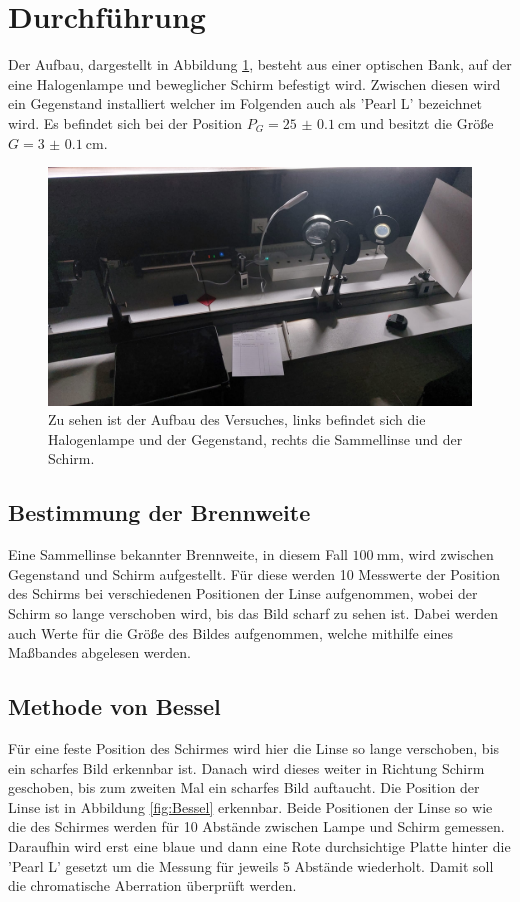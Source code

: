 \section{Durchführung}
\label{sec:Durchführung}
Der Aufbau, dargestellt in Abbildung \ref{fig:Aufbau}, besteht aus einer optischen Bank, auf der eine Halogenlampe und beweglicher Schirm befestigt wird. 
Zwischen diesen wird ein Gegenstand installiert welcher im Folgenden auch als 'Pearl L' bezeichnet wird.
Es befindet sich bei der Position $P_G=\qty{25(0.1)}{\centi\meter}$ und besitzt die Größe $G=\qty{3(0.1)}{\centi\meter}$.


\begin{figure}[H]
    \includegraphics[width=\textwidth]{Bilder/Aufbau.jpg}
    \centering
    \caption{Zu sehen ist der Aufbau des Versuches, links befindet sich die Halogenlampe und der Gegenstand, rechts die Sammellinse und der Schirm.}
    \label{fig:Aufbau}
\end{figure}

\subsection{Bestimmung der Brennweite}
Eine Sammellinse bekannter Brennweite, in diesem Fall $\qty{100}{\milli\meter}$, wird zwischen Gegenstand und Schirm aufgestellt.
Für diese werden 10 Messwerte der Position des Schirms bei verschiedenen Positionen der Linse aufgenommen, wobei der Schirm so lange verschoben wird, bis das Bild scharf zu sehen ist.
Dabei werden auch Werte für die Größe des Bildes aufgenommen, welche mithilfe eines Maßbandes abgelesen werden.

\subsection{Methode von Bessel}
Für eine feste Position des Schirmes wird hier die Linse so lange verschoben, bis ein scharfes Bild erkennbar ist. 
Danach wird dieses weiter in Richtung Schirm geschoben, bis zum zweiten Mal ein scharfes Bild auftaucht.
Die Position der Linse ist in Abbildung \ref{fig:Bessel} erkennbar.
Beide Positionen der Linse so wie die des Schirmes werden für 10 Abstände zwischen Lampe und Schirm gemessen.
Daraufhin wird erst eine blaue und dann eine Rote durchsichtige Platte hinter die 'Pearl L' gesetzt um die Messung für jeweils 5 Abstände wiederholt.
Damit soll die chromatische Aberration überprüft werden.

